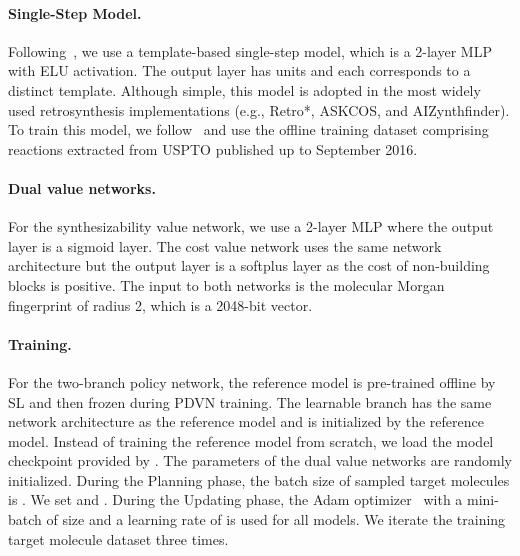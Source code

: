 \documentclass[nohyperref]{article}
\theoremstyle{plain}
\theoremstyle{definition}
\theoremstyle{remark}
\begin{document}
\paragraph{Single-Step Model.}
Following~\cite{Segler2018PlanningCS, chen20retrostar, kim2021self}, we use a template-based single-step model, which is a 2-layer MLP with ELU activation. The output layer has  units and each corresponds to a distinct template.
Although simple, this model is adopted in the most widely used retrosynthesis implementations (e.g., Retro*, ASKCOS, and AIZynthfinder). 
To train this model, we follow~\cite{chen20retrostar} and use the offline training dataset comprising  reactions extracted from USPTO published up to September 2016.


\paragraph{Dual value networks.}
For the synthesizability value network, we use a 2-layer MLP where the output layer is a sigmoid layer.
The cost value network uses the same network architecture but the output layer is a softplus layer as the cost of non-building blocks is positive.
The input to both networks is the molecular Morgan fingerprint of radius 2, which is a 2048-bit vector.

\paragraph{Training.}
For the two-branch policy network, the reference model is pre-trained offline by SL and then frozen during PDVN training. 
The learnable branch has the same network architecture as the reference model and is initialized by the reference model. 
Instead of training the reference model from scratch, we load the model checkpoint provided by \cite{chen20retrostar}.
The parameters of the dual value networks are randomly initialized.
During the Planning phase, the batch size of sampled target molecules is .
We set  and . 
During the Updating phase, the Adam optimizer~\cite{kingma2014adam} with a mini-batch of size  and a learning rate of  is used  for all models.
We iterate the training target molecule dataset  three times.
\end{document}

